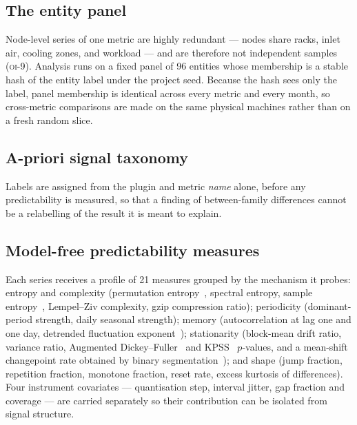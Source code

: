 \documentclass[11pt,a4paper]{article}
\newcommand{\num}[1]{#1}
\newcommand{\oi}[1]{\textsc{oi-#1}}
\begin{document}
\subsection{The entity panel}

Node-level series of one metric are highly redundant --- nodes share racks,
inlet air, cooling zones, and workload --- and are therefore not independent
samples (\oi{9}). Analysis runs on a fixed panel of \num{96} entities whose
membership is a stable hash of the entity label under the project seed. Because
the hash sees only the label, panel membership is identical across every metric
and every month, so cross-metric comparisons are made on the same physical
machines rather than on a fresh random slice.

\subsection{A-priori signal taxonomy}

Labels are assigned from the plugin and metric \emph{name} alone, before any
predictability is measured, so that a finding of between-family differences
cannot be a relabelling of the result it is meant to explain.

\subsection{Model-free predictability measures}

Each series receives a profile of \num{21} measures grouped by the mechanism it
probes: entropy and complexity (permutation entropy~\citep{bandt2002permutation}, spectral entropy, sample
entropy~\citep{richman2000physiological}, Lempel--Ziv complexity, gzip
compression ratio); periodicity (dominant-period strength, daily seasonal
strength); memory (autocorrelation at lag one and one day, detrended fluctuation
exponent~\citep{peng1994mosaic}); stationarity (block-mean drift ratio, variance
ratio, Augmented Dickey--Fuller~\citep{dickey1979distribution} and
KPSS~\citep{kwiatkowski1992testing} \(p\)-values, and a mean-shift changepoint
rate obtained by binary segmentation~\citep{truong2020selective}); and
shape (jump fraction, repetition fraction, monotone fraction, reset rate,
excess kurtosis of differences). Four instrument covariates --- quantisation
step, interval jitter, gap fraction and coverage --- are carried separately so
their contribution can be isolated from signal structure.
\end{document}

